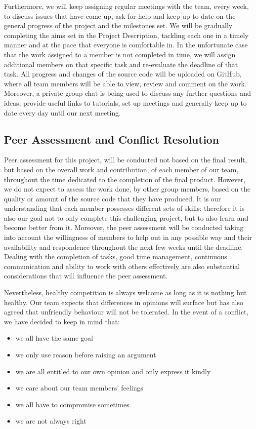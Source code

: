 \documentclass[11pt,a4paper]{article}
\begin{document}
Furthermore, we will keep assigning regular meetings with the team, every week, to discuss issues that have come up, ask for help and keep up to date on the general progress of the project and the milestones set. We will be gradually completing the aims set in the Project Description, tackling each one in a timely manner and at the pace that everyone is comfortable in. In the unfortunate case that the work assigned to a member is not completed in time, we will assign additional members on that specific task and re-evaluate the deadline of that task. All progress and changes of the source code will be uploaded on GitHub, where all team members will be able to view, review and comment on the work. Moreover, a private group chat is being used to discuss any further questions and ideas, provide useful links to tutorials, set up meetings and generally keep up to date every day until our next meeting.

\subsection{Peer Assessment and Conflict Resolution}

Peer assessment for this project, will be conducted not based on the final result, but based on the overall work and contribution, of each member of our team, throughout the time dedicated to the completion of the final product. However, we do not expect to assess the work done, by other group members, based on the quality or amount of the source code that they have produced. It is our understanding that each member possesses different sets of skills; therefore it is also our goal not to only complete this challenging project, but to also learn and become better from it. Moreover, the peer assessment will be conducted taking into account the willingness of members to help out in any possible way and their availability and respondence throughout the next few weeks until the deadline. Dealing with the completion of tasks, good time management, continuous communication and ability to work with others effectively are also substantial considerations that will influence the peer assessment.

Nevertheless, healthy competition is always welcome as long as it is nothing but healthy. Our team expects that differences in opinions will surface but has also agreed that unfriendly behaviour will not be tolerated. In the event of a conflict, we have decided to keep in mind that:

\begin{itemize}[nosep, wide=20pt, leftmargin=*, after=\strut]
    \item we all have the same goal 
    \item we only use reason before raising an argument
    \item we are all entitled to our own opinion and only express it kindly
    \item we care about our team members’ feelings 
    \item we all have to compromise sometimes 
    \item we are not always right
\end{itemize}
\end{document}
